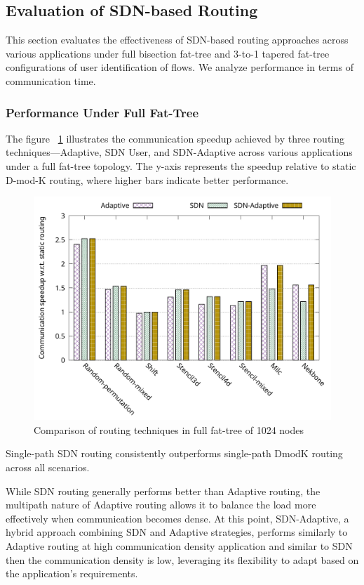 \subsection{Evaluation of SDN-based Routing}
This section evaluates the effectiveness of SDN-based routing approaches across various applications under full bisection fat-tree and 3-to-1 tapered fat-tree configurations of user identification of flows. We analyze performance in terms of communication time.

\subsubsection{Performance Under Full Fat-Tree}
The figure ~\ref{fig:routing_full} illustrates the communication speedup achieved by three routing techniques—Adaptive, SDN User, and SDN-Adaptive across various applications under a full fat-tree topology. The y-axis represents the speedup relative to static D-mod-K routing, where higher bars indicate better performance.


\begin{figure}[h]
  \centering
  \includegraphics[width=\columnwidth]{./figs_4/routing_full.pdf}
  \caption{Comparison of routing techniques in full fat-tree of 1024 nodes}
  \label{fig:routing_full}
\end{figure}
Single-path SDN routing consistently outperforms single-path DmodK routing across all scenarios.

While SDN routing generally performs better than Adaptive routing, the multipath nature of Adaptive routing allows it to balance the load more effectively when communication becomes dense. At this point, SDN-Adaptive, a hybrid approach combining SDN and Adaptive strategies, performs similarly to Adaptive routing at high communication density application and similar to SDN then the communication density is low, leveraging its flexibility to adapt based on the application's requirements.

